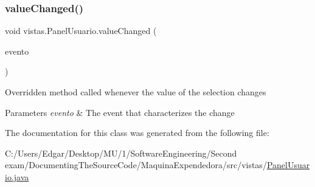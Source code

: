\subsubsection{\texorpdfstring{value\+Changed()}{valueChanged()}}
{\footnotesize\ttfamily void vistas.\+Panel\+Usuario.\+value\+Changed (\begin{DoxyParamCaption}\item[{List\+Selection\+Event}]{evento }\end{DoxyParamCaption})\hspace{0.3cm}{\ttfamily [inline]}}

Overridden method called whenever the value of the selection changes 
\begin{DoxyParams}{Parameters}
{\em evento} & The event that characterizes the change \\
\hline
\end{DoxyParams}


The documentation for this class was generated from the following file\+:\begin{DoxyCompactItemize}
\item 
C\+:/\+Users/\+Edgar/\+Desktop/\+M\+U/1/\+Software\+Engineering/\+Second exam/\+Documenting\+The\+Source\+Code/\+Maquina\+Expendedora/src/vistas/\mbox{\hyperlink{_panel_usuario_8java}{Panel\+Usuario.\+java}}\end{DoxyCompactItemize}
